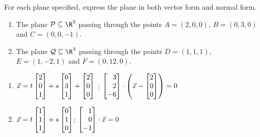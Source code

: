 \begin{exercises}
\begin{problist}
		\prob For each plane specified, express the plane in both vector form and normal form.
		\begin{enumerate}
			\item The plane $\mathcal P\subseteq\R^3$ passing through the points
			$A=(2,0,0)$, $B=(0,3,0)$ and $C=(0,0,-1)$.
			\item The plane $\mathcal Q\subseteq\R^3$ passing through the points
			$D=(1,1,1)$, $E=(1,-2,1)$ and $F=(0,12,0)$.
		\end{enumerate}
		\begin{solution}
			\begin{enumerate}
				\item $\vec x=t\mat{2\\0\\1}+s\mat{0\\3\\1}+\mat{2\\0\\0}$ ; $\mat{3\\2\\-6}\cdot\left(\vec x-\mat{2\\0\\0}\right)=0$
				\item $\vec x=t\mat{1\\1\\1}+s\mat{0\\1\\0}$; $\mat{1\\0\\-1}\cdot\vec x=0$
			\end{enumerate}
		\end{solution}
		

\end{problist}
\end{exercises}
